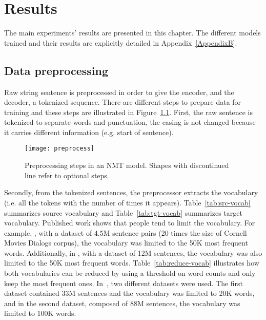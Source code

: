 
\chapter{Results} %
\label{Chapter4} %

The main experiments' results are presented in this chapter. The different models trained and their results are explicitly detailed in Appendix~\ref{AppendixB}.


\section{Data preprocessing}
Raw string sentence is preprocessed in order to give the encoder, and the decoder, a tokenized sequence. There are different steps to prepare data for training and these steps are illustrated in Figure~\ref{fig:preprocess}. First, the raw sentence is tokenized to separate words and punctuation, the casing is not changed because it carries different information (e.g. start of sentence).

\begin{figure}
    \centering
    \texttt{[image: preprocess]}
    \decoRule
    \caption[Preprocessing steps in NMT]{Preprocessing steps in an NMT model. Shapes with discontinued line refer to optional steps.}
    \label{fig:preprocess}
\end{figure}

Secondly, from the tokenized sentences, the preprocessor extracts the vocabulary (i.e. all the tokens with the number of times it appears). Table~\ref{tab:src-vocab} summarizes source vocabulary and Table~\ref{tab:tgt-vocab} summarizes target vocabulary.
Published work shows that people tend to limit the vocabulary. For example, \citet{1508.04025}, with a dataset of 4.5M sentence pairs (20 times the size of Cornell Movies Dialogs corpus), the vocabulary was limited to the 50K most frequent words. Additionally, in \citet{1506.06714}, with a dataset of 12M sentences, the vocabulary was also limited to the 50K most frequent words.
Table~\ref{tab:reduce-vocab} illustrates how both vocabularies can be reduced by using a threshold on word counts and only keep the most frequent ones.
In~\citet{1506.05869}, two different datasets were used. The first dataset contained 33M sentences and the vocabulary was limited to 20K words, and in the second dataset, composed of 88M sentences, the vocabulary was limited to 100K words.


